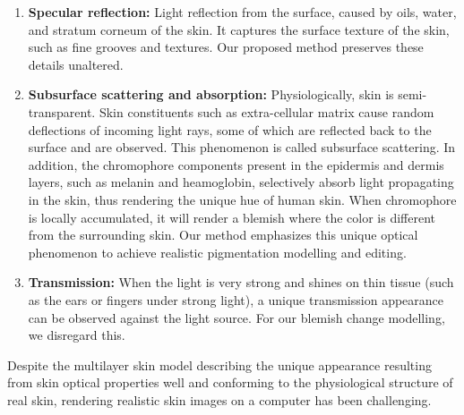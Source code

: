 \begin{spacing}{1.5}
\begin{enumerate}
    \item \textbf{Specular reflection:} Light reflection from the surface, caused by oils, water, and stratum corneum of the skin. It captures the surface texture of the skin, such as fine grooves and textures. Our proposed method preserves these details unaltered.
    \item \textbf{Subsurface scattering and absorption:} Physiologically, skin is semi-transparent\cite{Igarashi2005TheAO}. Skin constituents such as extra-cellular matrix cause random deflections of incoming light rays, some of which are reflected back to the surface and are observed. This phenomenon is called subsurface scattering. In addition, the chromophore components present in the epidermis and dermis layers, such as melanin and heamoglobin, selectively absorb light propagating in the skin, thus rendering the unique hue of human skin. When chromophore is locally accumulated, it will render a blemish where the color is different from the surrounding skin\cite{ANDERSON198113}. Our method emphasizes this unique optical phenomenon to achieve realistic pigmentation modelling and editing.
    \item \textbf{Transmission:} When the light is very strong and shines on thin tissue (such as the ears or fingers under strong light), a unique transmission appearance can be observed against the light source. For our blemish change modelling, we disregard this.
\end{enumerate}

Despite the multilayer skin model describing the unique appearance resulting from skin optical properties well and conforming to the physiological structure of real skin, rendering realistic skin images on a computer has been challenging. 


\end{spacing}
